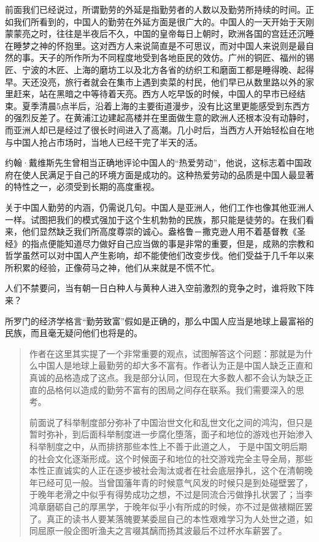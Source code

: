 \documentclass[12pt,oneside]{book}
\begin{document}
\begin{common-format}
前面我们已经说过，所谓勤劳的外延是指勤劳者的人数以及勤劳所持续的时间。正如我们所看到的，中国人的勤劳在外延方面是很广大的。中国人的一天开始于天刚蒙蒙亮之时，往往是半夜后不久，中国的皇帝每日上朝时，欧洲各国的宫廷还沉睡在睡梦之神的怀抱里。这对西方人来说简直是不可思议，而对中国人来说则是最自然的事。天子的所作所为不同程度地受到各地臣民的效仿。广州的铜匠、福州的锡匠、宁波的木匠、上海的磨坊工以及北方各省的纺织工和磨面工都是睡得晚、起得早。天还没亮，旅行者就会在集市上遇到卖菜的村民，他们早已从数里路以外的家里赶来，站在黑暗之中等待着天亮。西方人吃早饭的时候，中国人的早市已经结束。夏季清晨5点半后，沿着上海的主要街道漫步，没有比这里更能感受到东西方的强烈反差了。在黄浦江边建起高楼并在里面做生意的欧洲人还根本没有动静时，而亚洲人却已是经过了很长时间进入了高潮。几小时后，当西方人开始轻松自在地与中国人抢占市场时，当地人已经干完了半天的活。 

约翰·戴维斯先生曾相当正确地评论中国人的“热爱劳动”，他说，这标志着中国政府在使人民满足于自己的环境方面是成功的。这种热爱劳动的品质是中国人最显著的特性之一，必须受到长期的高度重视。 

关于中国人勤劳的内涵，仍需说几句。中国人是亚洲人，他们工作也像其他亚洲人一样。试图把我们的模式强加于这个生机勃勃的民族，那只能是徒劳的。在我们看来，他们显然缺乏我们所高度尊崇的诚心。盎格鲁－撒克逊人用不着基督教《圣经》的指点便能知道尽力做好自己应当做的事是非常的重要，但是，成熟的宗教和哲学虽然可以对中国人产生影响，却不能使他们改变步伐。他们受益于几千年以来所积累的经验，正像荷马之神，他们从来就是不慌不忙。 

人们不禁要问，当有朝一日白种人与黄种人进入空前激烈的竞争之时，谁将败下阵来？ 

所罗门的经济学格言“勤劳致富”假如是正确的，那么中国人应当是地球上最富裕的民族，而且毫无疑问他们也将是的。

\begin{quotation}
作者在这里其实提了一个非常重要的观点，试图解答这个问题：那就是为什么中国人是地球上最勤劳的却大多不富有。作者认为正是中国人缺乏正直和真诚的品格造成了这点。我是部分认同，但现在大多数人都不会认为缺乏正直的品格何以造成的勤劳不富有的困局之间存在联系。我们需要深入的思考。

前面说了科举制度部分弥补了中国治世文化和乱世文化之间的鸿沟，但只是暂时弥补，到后面科举制度进一步腐化堕落，面子和地位的游戏也开始渗入科举制度之中，从而排挤那些本性上不善于此道之人， 于是中国文明后期的社会文化逐渐形成。这个时候面子和地位的社交游戏完全主导全局，那些本性正直诚实的人正在逐步被社会淘汰或者在社会底层挣扎，这个在清朝晚年已经可见一般。当曾国藩年青的时候意气风发的时候只是到处碰壁罢了，于晚年老滑之中似乎有得势成功之想，不过是同流合污做挣扎状罢了；当李鸿章磨砺自己的厚黑学，于晚年似乎小有所成的时候，亦不过是做裱糊匠罢了。真正的读书人要某落魄要某委屈自己的本性艰难学习为人处世之道，如同屈原一般企图听渔夫之言啜其醨而扬其波最后不过杯水车薪罢了。


\end{quotation}
\end{common-format}
\end{document}
